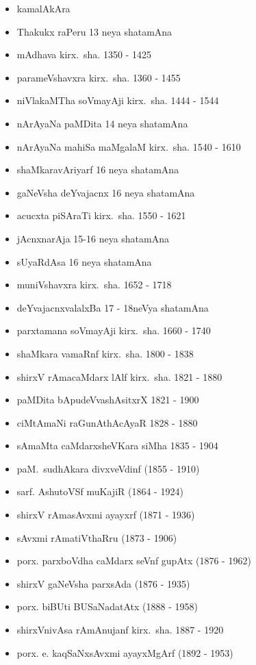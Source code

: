 {\begin{itemize}
\item kamalAkAra
\item Thakukx raPeru {\rm 13} neya shatamAna
\item mAdhava kirx.~sha. {\rm 1350 - 1425}
\item parameVshavxra kirx.~sha. {\rm 1360 - 1455}
\item niVlakaMTha soVmayAji kirx.~sha. {\rm 1444 - 1544}
\item nArAyaNa paMDita {\rm 14} neya shatamAna
\item nArAyaNa mahiSa maMgalaM kirx.~sha. {\rm 1540 - 1610}
\item shaMkaravAriyarf {\rm 16} neya shatamAna
\item gaNeVsha deYvajacnx {\rm 16} neya shatamAna
\item acucxta piSAraTi kirx.~sha. {\rm 1550 - 1621}
\item jAcnxnarAja {\rm 15-16} neya shatamAna
\item sUyaRdAsa {\rm 16} neya shatamAna
\item muniVshavxra kirx.~sha. {\rm 1652 - 1718}
\item deYvajacnxvalalxBa {\rm 17 - 18}neVya shatamAna
\item parxtamana soVmayAji kirx.~sha. {\rm 1660 - 1740}
\item shaMkara vamaRnf kirx.~sha. {\rm 1800 - 1838}
\item shirxV rAmacaMdarx lAlf kirx.~sha. {\rm 1821 - 1880}
\item paMDita bApudeVvashAsitxrX {\rm 1821 - 1900}
\item ciMtAmaNi raGunAthAcAyaR {\rm 1828 - 1880}
\item sAmaMta caMdarxsheVKara siMha {\rm 1835 - 1904}
\item paM.~sudhAkara divxveVdinf {\rm (1855 - 1910)}
\item sarf. AshutoVSf muKajiR {\rm (1864 - 1924)}
\item shirxV rAmasAvxmi ayayxrf {\rm (1871 - 1936)}
\item sAvxmi rAmatiVthaRru {\rm (1873 - 1906)}
\item porx. parxboVdha caMdarx seVnf gupAtx {\rm (1876 - 1962)}
\item shirxV gaNeVsha parxsAda {\rm (1876 - 1935)}
\item porx. biBUti BUSaNadatAtx {\rm (1888 - 1958)}
\item shirxVnivAsa rAmAnujanf kirx.~sha. {\rm 1887 - 1920}
\item porx. e. kaqSaNxsAvxmi ayayxMgArf {\rm (1892 - 1953)}

\end{itemize}}
